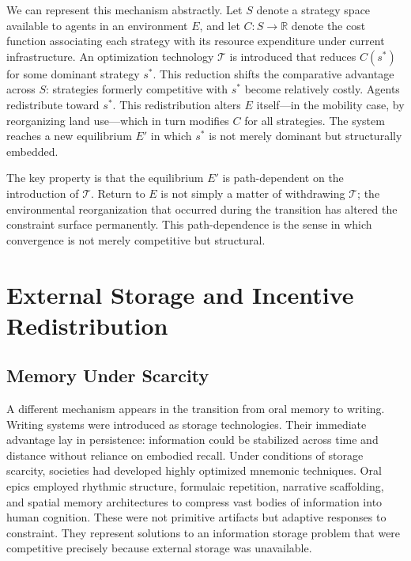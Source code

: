 \documentclass[12pt, oneside]{book}
\theoremstyle{plain}
\theoremstyle{definition}
\theoremstyle{remark}
\theoremstyle{definition}
\begin{document}
We can represent this mechanism abstractly. Let $S$ denote a strategy space available
to agents in an environment $E$, and let $C: S \to \mathbb{R}$ denote the cost
function associating each strategy with its resource expenditure under current
infrastructure. An optimization technology $\mathcal{T}$ is introduced that reduces
$C(s^*)$ for some dominant strategy $s^*$. This reduction shifts the comparative
advantage across $S$: strategies formerly competitive with $s^*$ become relatively
costly. Agents redistribute toward $s^*$. This redistribution alters $E$ itself---in
the mobility case, by reorganizing land use---which in turn modifies $C$ for all
strategies. The system reaches a new equilibrium $E'$ in which $s^*$ is not merely
dominant but structurally embedded.

The key property is that the equilibrium $E'$ is path-dependent on the introduction
of $\mathcal{T}$. Return to $E$ is not simply a matter of withdrawing $\mathcal{T}$;
the environmental reorganization that occurred during the transition has altered the
constraint surface permanently. This path-dependence is the sense in which convergence
is not merely competitive but structural.

\chapter{External Storage and Incentive Redistribution}
\label{ch:storage}

\section{Memory Under Scarcity}

A different mechanism appears in the transition from oral memory to writing. Writing
systems were introduced as storage technologies. Their immediate advantage lay in
persistence: information could be stabilized across time and distance without reliance
on embodied recall. Under conditions of storage scarcity, societies had developed
highly optimized mnemonic techniques. Oral epics employed rhythmic structure,
formulaic repetition, narrative scaffolding, and spatial memory architectures to
compress vast bodies of information into human cognition. These were not primitive
artifacts but adaptive responses to constraint. They represent solutions to an
information storage problem that were competitive precisely because external storage
was unavailable.
\end{document}

